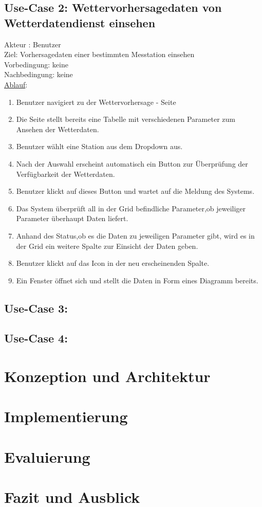 \documentclass[a4paper,12pt]{scrreprt}
\begin{document}
\section*{\small \textbf{Use-Case 2: Wettervorhersagedaten von Wetterdatendienst einsehen}}
Akteur : Benutzer\\
Ziel:  Vorhersagedaten einer bestimmten Messtation einsehen\\
Vorbedingung: keine\\
Nachbedingung: keine\\
\underline{Ablauf}:
\begin{enumerate}
\item Benutzer navigiert zu der Wettervorhersage - Seite
\item Die Seite stellt bereits eine Tabelle mit verschiedenen Parameter zum Ansehen der Wetterdaten.
\item Benutzer wählt eine Station aus dem Dropdown aus.
\item Nach der Auswahl erscheint automatisch ein Button zur Überprüfung der Verfügbarkeit der Wetterdaten.
\item Benutzer klickt auf dieses Button und wartet auf die Meldung des Systems.
\item Das System überprüft all in der Grid befindliche Parameter,ob jeweiliger Parameter überhaupt Daten liefert. 
\item Anhand des Status,ob es die Daten zu jeweiligen Parameter gibt, wird es in der Grid ein weitere Spalte zur Einsicht der Daten geben. 
\item Benutzer klickt auf das Icon in der neu erscheinenden Spalte.
\item Ein Fenster öffnet sich und stellt die Daten in Form eines Diagramm bereits. 
\end{enumerate}


\section*{\small \textbf{Use-Case 3:}}
\section*{\small \textbf{Use-Case 4:}}


\chapter{Konzeption und Architektur}

\chapter{Implementierung}

\chapter{Evaluierung}

\chapter{Fazit und Ausblick}

\printbibliography
\end{document}
